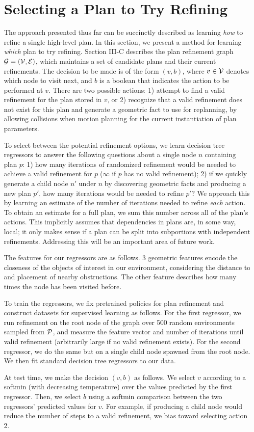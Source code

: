 \section{Selecting a Plan to Try Refining}
The approach presented thus far can be succinctly described as learning \emph{how} to
refine a single high-level plan. In this section, we present a method for learning
\emph{which} plan to try refining. Section III-C describes the plan refinement graph $\mathcal{G} = (\mathcal{V}, \mathcal{E})$,
which maintains a set of candidate plans and their current refinements. The decision to be made is of the form $(v, b)$,
where $v \in \mathcal{V}$ denotes which node to visit next, and $b$ is a boolean that indicates the action
to be performed at $v$. There are two possible actions: 1) attempt to find a valid refinement
for the plan stored in $v$, or 2) recognize that a valid refinement does not exist for this plan
and generate a geometric fact to use for replanning, by allowing collisions when motion planning
for the current instantiation of plan parameters.

To select between the potential refinement options, we learn decision tree regressors
to answer the following questions about a single node $n$ containing plan $p$: 1) how many iterations of randomized refinement
would be needed to achieve a valid refinement for $p$ ($\infty$ if $p$ has no valid refinement); 2)
if we quickly generate a child node $n'$ under $n$ by discovering geometric facts and producing a new plan $p'$,
how many iterations would be needed to refine $p'$? We approach this by learning an estimate of the
number of iterations needed to refine \emph{each} action. To obtain an estimate for a full plan, we
sum this number across all of the plan's actions. This implicitly assumes that dependencies in plans are, in some way, local;
it only makes sense if a plan can be split into subportions with independent refinements.
Addressing this will be an important area of future work.

The features for our regressors are as follows. 3 geometric features encode the closeness of the objects
of interest in our environment, considering the distance to and placement of nearby obstructions. The other
feature describes how many times the node has been visited before.

To train the regressors, we fix pretrained policies for plan refinement and construct datasets
for supervised learning as follows. For the first regressor, we run refinement on the root
node of the graph over 500 random environments sampled from $\mathcal{P}$, and measure the feature vector and number of iterations
until valid refinement (arbitrarily large if no valid refinement exists).
For the second regressor, we do the same but on a single child node spawned from the root node.
We then fit standard decision tree regressors to our data.

At test time, we make the decision $(v, b)$ as follows. We select $v$ according to a softmin (with decreasing temperature) over the values
predicted by the first regressor. Then, we select $b$ using a softmin comparison between the two regressors'
predicted values for $v$. For example, if producing a child node would reduce the number of steps to a valid refinement,
we bias toward selecting action 2.